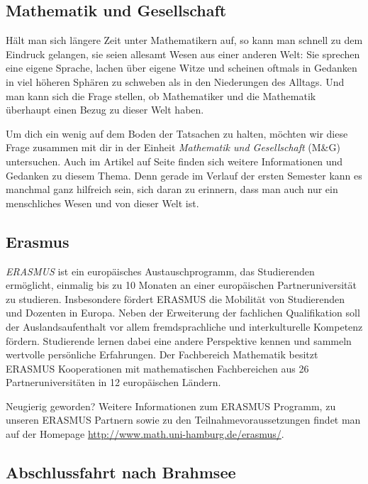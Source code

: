 \subsection*{Mathematik und Gesellschaft}

Hält man sich längere Zeit unter Mathematikern auf, so kann man schnell zu dem
Eindruck gelangen, sie seien allesamt Wesen aus einer anderen Welt: Sie
sprechen eine eigene Sprache, lachen über eigene Witze und scheinen oftmals in
Gedanken in viel höheren Sphären zu schweben als in den Niederungen des
Alltags.  Und man kann sich die Frage stellen, ob Mathematiker und die
Mathematik überhaupt einen Bezug zu dieser Welt haben.


Um dich ein wenig auf dem Boden der Tatsachen zu halten, möchten wir diese
Frage zusammen mit dir in der Einheit \emph{Mathematik und Gesellschaft} (M\&G)
untersuchen. Auch im Artikel auf Seite \pageref{page:mug} finden sich weitere
Informationen und Gedanken zu diesem Thema. Denn gerade im Verlauf der ersten
Semester kann es manchmal ganz hilfreich sein, sich daran zu erinnern, dass man
auch nur ein menschliches Wesen und von dieser Welt ist.

\subsection{Erasmus}


\emph{ERASMUS} ist ein europäisches Austauschprogramm, das Studierenden
ermöglicht, einmalig bis zu 10 Monaten an einer europäischen Partneruniversität
zu studieren. Insbesondere fördert ERASMUS die Mobilität von Studierenden und
Dozenten in Europa. Neben der Erweiterung der fachlichen Qualifikation soll der
Auslandsaufenthalt vor allem fremdsprachliche und interkulturelle Kompetenz
fördern. Studierende lernen dabei eine andere Perspektive kennen und sammeln
wertvolle persönliche Erfahrungen. Der Fachbereich Mathematik besitzt ERASMUS
Kooperationen mit mathematischen Fachbereichen aus 26 Partneruniversitäten in
12 europäischen Ländern.

Neugierig geworden? Weitere Informationen zum ERASMUS Programm, zu unseren
ERASMUS Partnern sowie zu den Teilnahmevoraussetzungen findet man auf der
Homepage \url{http://www.math.uni-hamburg.de/erasmus/}.

\subsection*{Abschlussfahrt nach Brahmsee}

